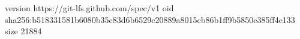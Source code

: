 version https://git-lfs.github.com/spec/v1
oid sha256:b518331581b6080b35c83d6b6529c20889a8015cb86b1ff9b5850e385ff4e133
size 21884

